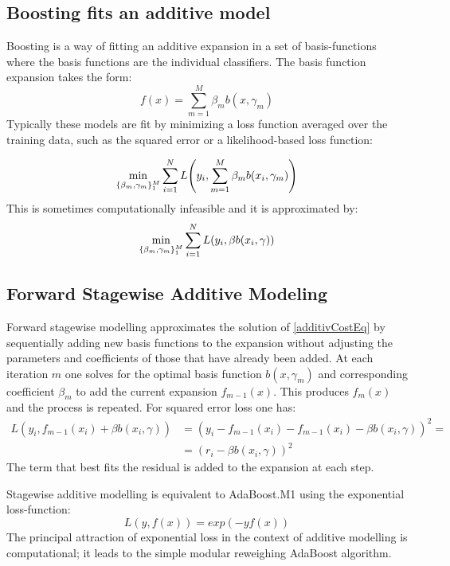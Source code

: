 \documentclass[12pt, letterpaper]{article}
\theoremstyle{definition}
\DeclarePairedDelimiter\autobracket{(}{)}
\newcommand{\br}[1]{\autobracket*{#1}}
\begin{document}
\subsection{Boosting fits an additive model}
Boosting is a way of fitting an additive expansion in a set of basis-functions where the basis functions are the individual classifiers. The basis function expansion takes the form:
\begin{equation}
f(x) = \sum_{m=1}^M \beta_m b(x, \gamma_m)
\end{equation}
Typically these models are fit by minimizing a loss function averaged over the training data, such as the squared error or a likelihood-based loss function:

\begin{equation}
\min_{\{\beta_m, \gamma_m\}_1^M} \sum_{i=1}^N L\br{y_i, \sum_{m=1}^M \beta_m b(x_i, \gamma_m)}
\label{additivCostEq}
\end{equation}
This is sometimes computationally infeasible and it is approximated by:
\begin{equation}
\min_{\{\beta_m, \gamma_m\}_1^M} \sum_{i=1}^N L\br{y_i, \beta b(x_i, \gamma)}
\end{equation}
\subsection{Forward Stagewise Additive Modeling}
Forward stagewise modelling approximates the solution of \autoref{additivCostEq} by sequentially adding new basis functions to the expansion without adjusting the parameters and coefficients of those that have already been added. At each iteration $m$ one solves for the optimal basis function $b(x, \gamma_m)$ and corresponding coefficient $\beta_m$ to add the current expansion $f_{m-1}(x)$. This produces $f_m(x)$ and the process is repeated. For squared error loss one has:
\begin{equation}
\begin{aligned}
L(y_i, f_{m-1}(x_i)+\beta b(x_i, \gamma)) &= (y_i-f_{m-1}(x_i)-f_{m-1}(x_i)-\beta b(x_i, \gamma))^2 =\\
 &=(r_i-\beta b(x_i, \gamma))^2
\end{aligned}
\end{equation}
The term that best fits the residual is added to the expansion at each step.

Stagewise additive modelling is equivalent to AdaBoost.M1 using the exponential loss-function:
\begin{equation}
L(y, f(x))  = exp(-yf(x))
\end{equation}
The principal attraction of exponential loss in the context of additive modelling is computational; it leads to the simple modular reweighing AdaBoost algorithm.
\end{document}
